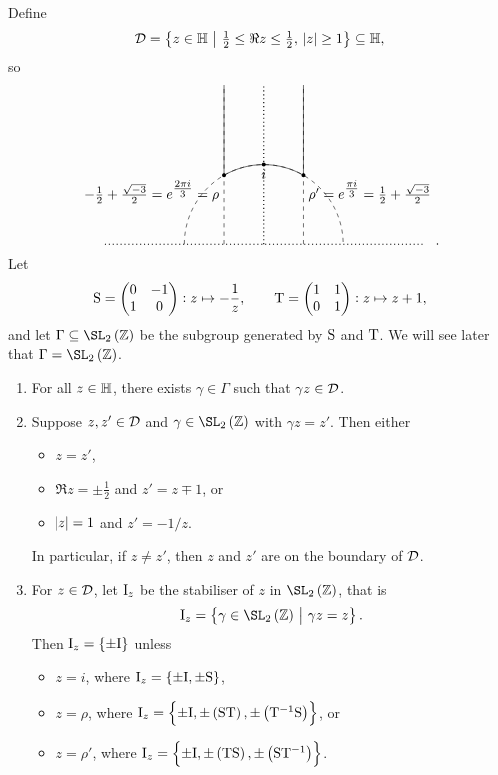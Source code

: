 Define
$$ \DDD = \cbr{z \in \HH \st \tfrac{1}{2} \le \Re z \le \tfrac{1}{2}, \ \abs{z} \ge 1} \subseteq \HH, $$
so
$$
\begin{tikzpicture}[scale=2]
\draw [dotted, thick] (-2, 0) to (2, 0);
\draw [dotted, thick] (0, 0) to (0, 2);
\draw [dashed] (-1, 0) arc (180:0:1);
\draw [dashed] (-0.5, 0) to (-0.5, 2);
\draw [dashed] (0.5, 0) to (0.5, 2);
\draw (-0.5, 0.866) arc (120:60:1);
\draw (-0.5, 0.866) to (-0.5, 2);
\draw (0.5, 0.866) to (0.5, 2);
\fill (0, 1) circle (0.025) node[below]{$ i $};
\fill (-0.5, 0.866) circle (0.025) node[below left]{$ -\tfrac{1}{2} + \tfrac{\sqrt{-3}}{2} = e^{\tfrac{2\pi i}{3}} = \rho $};
\fill (0.5, 0.866) circle (0.025) node[below right]{$ \rho' = e^{\tfrac{\pi i}{3}} = \tfrac{1}{2} + \tfrac{\sqrt{-3}}{2} $};
\end{tikzpicture}.
$$
Let
$$ \S = \twobytwo{0}{-1}{1}{0} : z \mapsto -\dfrac{1}{z}, \qquad \T = \twobytwo{1}{1}{0}{1} : z \mapsto z + 1, $$
and let $ \Gamma \subseteq \SL_2\br{\ZZ} $ be the subgroup generated by $ \S $ and $ \T $. We will see later that $ \Gamma = \SL_2\br{\ZZ} $.

\begin{theorem}
\label{thm:fundamentaldomain}
\hfill
\begin{enumerate}
\item For all $ z \in \HH $, there exists $ \gamma \in \Gamma $ such that $ \gamma z \in \DDD $.
\item Suppose $ z, z' \in \DDD $ and $ \gamma \in \SL_2\br{\ZZ} $ with $ \gamma z = z' $. Then either
\begin{itemize}
\item $ z = z' $,
\item $ \Re z = \pm\tfrac{1}{2} $ and $ z' = z \mp 1 $, or
\item $ \abs{z} = 1 $ and $ z' = -1 / z $.
\end{itemize}
In particular, if $ z \ne z' $, then $ z $ and $ z' $ are on the boundary of $ \DDD $.
\item For $ z \in \DDD $, let $ \I_z $ be the stabiliser of $ z $ in $ \SL_2\br{\ZZ} $, that is
$$ \I_z = \cbr{\gamma \in \SL_2\br{\ZZ} \st \gamma z = z}. $$
Then $ \I_z = \cbr{\pm\I} $ unless
\begin{itemize}
\item $ z = i $, where $ \I_z = \cbr{\pm\I, \pm \S} $,
\item $ z = \rho $, where $ \I_z = \cbr{\pm\I, \pm\br{\S\T}, \pm\br{\T^{-1}\S}} $, or
\item $ z = \rho' $, where $ \I_z = \cbr{\pm\I, \pm\br{\T\S}, \pm\br{\S\T^{-1}}} $.
\end{itemize}
\end{enumerate}
\end{theorem}

